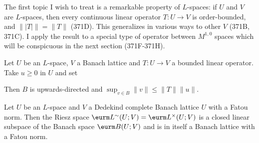 
\def\chaptername{Linear operators between function spaces}
\def\sectionname{The Chacon-Krengel theorem}


The first topic I wish to treat is a remarkable property of $L$-spaces:
if $U$ and $V$ are $L$-spaces, then every continuous linear operator
$T:U\to V$ is order-bounded, and $\||T|\|=\|T\|$ (371D).   This
generalizes in
various ways to other $V$ (371B, 371C).   I apply the result to a
special type of operator between $M^{1,0}$ spaces which will be
conspicuous in the next section (371F-371H).

 Let $U$ be an $L$-space, $V$ a Banach lattice and
$T:U\to V$ a bounded linear operator.   Take $u\ge 0$ in $U$ and set


\noindent Then $B$ is upwards-directed and
$\sup_{v\in B}\|v\|\le\|T\|\|u\|$.


 Let $U$ be an
$L$-space and $V$ a Dedekind complete Banach
lattice $U$ with a Fatou norm.   Then the Riesz space
$\eurm L^{\sim}(U;V)=\eurm L^{\times}(U;V)$ is a closed linear
subspace of the Banach space $\eurm B(U;V)$ and is in itself a Banach
lattice with a Fatou norm.

